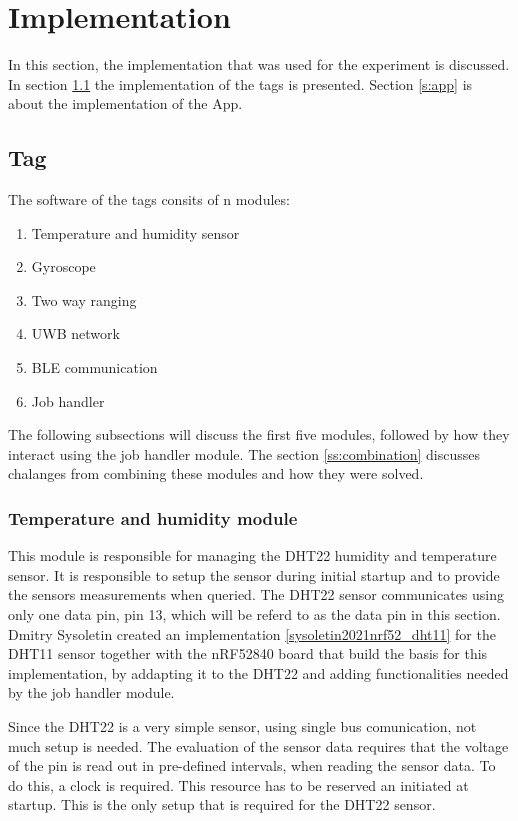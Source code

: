 \chapter{Implementation}
\label{c:implementation}

In this section, the implementation that was used for the experiment is discussed.
In section \ref{s:tag} the implementation of the tags is presented.
Section \ref{s:app} is about the implementation of the App.

\section{Tag}
\label{s:tag}
The software of the tags consits of n modules:
\begin{enumerate}
	\item Temperature and humidity sensor
	\item Gyroscope
	\item Two way ranging
	\item UWB network
	\item BLE communication
	\item Job handler
\end{enumerate}
The following subsections will discuss the first five modules, followed by how they interact using the job handler module.
The section \ref{ss:combination} discusses chalanges from combining these modules and how they were solved.

\subsection{Temperature and humidity module}
\label{ss:temp_hum_module}
This module is responsible for managing the DHT22 humidity and temperature sensor.
It is responsible to setup the sensor during initial startup and to provide the sensors measurements when queried.
The DHT22 sensor communicates using only one data pin, pin 13, which will be referd to as the data pin in this section.
Dmitry Sysoletin created an implementation \ref{sysoletin2021nrf52_dht11} for the DHT11 sensor together with the nRF52840 board that build the basis for this implementation, by addapting it to the DHT22 and adding functionalities needed by the job handler module.


Since the DHT22 is a very simple sensor, using single bus comunication, not much setup is needed.
The evaluation of the sensor data requires that the voltage of the pin is read out in pre-defined intervals, when reading the sensor data.
To do this, a clock is required.
This resource has to be reserved an initiated at startup.
This is the only setup that is required for the DHT22 sensor.


